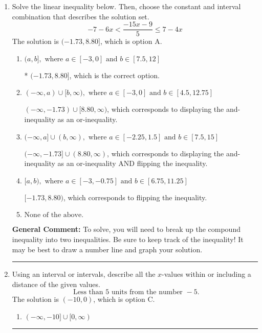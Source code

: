 \documentclass{extbook}[14pt]
\newcommand{\litem}[1]{\item #1

\rule{\textwidth}{0.4pt}}
\begin{document}
\begin{enumerate}
{\begin{enumerate}[label=\Alph*.]
Corresponds to inverting the inequality and negating the solution.
\item \( (-\infty, \infty) \)

Corresponds to the variable canceling, which does not happen in this instance.
\end{enumerate}

\textbf{General Comment:} When multiplying or dividing by a negative, flip the sign.
}
\litem{
Solve the linear inequality below. Then, choose the constant and interval combination that describes the solution set.
\[ -7 - 6 x < \frac{-15 x - 9}{5} \leq 7 - 4 x \]The solution is \( (-1.73, 8.80] \), which is option A.\begin{enumerate}[label=\Alph*.]
\item \( (a, b], \text{ where } a \in [-3, 0] \text{ and } b \in [7.5, 12] \)

* $(-1.73, 8.80]$, which is the correct option.
\item \( (-\infty, a) \cup [b, \infty), \text{ where } a \in [-3, 0] \text{ and } b \in [4.5, 12.75] \)

$(-\infty, -1.73) \cup [8.80, \infty)$, which corresponds to displaying the and-inequality as an or-inequality.
\item \( (-\infty, a] \cup (b, \infty), \text{ where } a \in [-2.25, 1.5] \text{ and } b \in [7.5, 15] \)

$(-\infty, -1.73] \cup (8.80, \infty)$, which corresponds to displaying the and-inequality as an or-inequality AND flipping the inequality.
\item \( [a, b), \text{ where } a \in [-3, -0.75] \text{ and } b \in [6.75, 11.25] \)

$[-1.73, 8.80)$, which corresponds to flipping the inequality.
\item \( \text{None of the above.} \)


\end{enumerate}

\textbf{General Comment:} To solve, you will need to break up the compound inequality into two inequalities. Be sure to keep track of the inequality! It may be best to draw a number line and graph your solution.
}
\litem{
Using an interval or intervals, describe all the $x$-values within or including a distance of the given values.
\[ \text{ Less than } 5 \text{ units from the number } -5. \]The solution is \( (-10, 0) \), which is option C.\begin{enumerate}[label=\Alph*.]
\item \( (-\infty, -10] \cup [0, \infty) \)


\end{enumerate}}
\end{enumerate}
\end{document}

